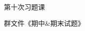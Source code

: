 \documentclass{article}
\begin{document}
 \renewcommand{\thenum}{\arabic{num}.} \newcommand{\num}{\refstepcounter{num}\text{\thenum}}

\newenvironment{jie}{\kaishu\zihao{-5}\color{blue}{\noindent\em 解：}\par}{\hfill $\diamondsuit$\par}

\newenvironment{zhengming}{\kaishu\zihao{-5}\color{blue}{\noindent\em 证明：}\par}{\hfill $\diamondsuit$\par}

\hphantom{~~}\hfill {\heiti 第十次习题课} \hfill\hphantom{~~}

\hphantom{~~}\hfill {\heiti 群文件《期中$\&$期末试题》} \hfill\hphantom{~~}

%
%
%
\end{document}

